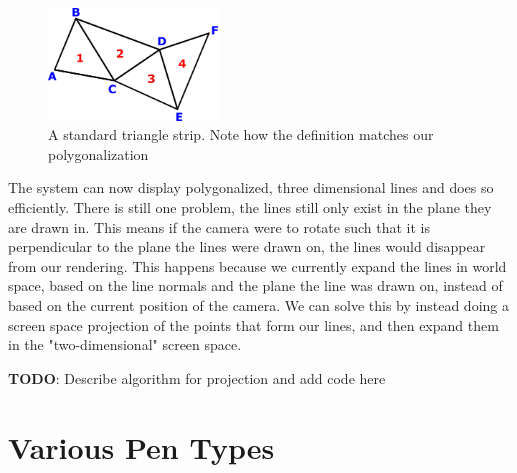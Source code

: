 \documentclass[12pt]{report}
\begin{document}
\begin{figure}
	\begin{center}
		\includegraphics[width=0.40\textwidth]{trianglestrip.png}
	\end{center}
	\caption{A standard triangle strip. Note how the definition matches our polygonalization}
\end{figure}

The system can now display polygonalized, three dimensional lines and does so efficiently.
There is still one problem, the lines still only exist in the plane they are drawn in.
This means if the camera were to rotate such that it is perpendicular to the plane the lines were drawn on, the lines would disappear from our rendering.
This happens because we currently expand the lines in world space, based on the line normals and the plane the line was drawn on, instead of based on the current position of the camera.
We can solve this by instead doing a screen space projection of the points that form our lines, and then expand them in the "two-dimensional" screen space.

\noindent \textbf{TODO}: Describe algorithm for projection and add code here

\section{Various Pen Types}

 
\end{document}
